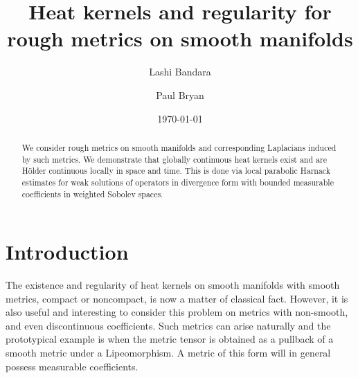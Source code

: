 \documentclass[a4paper, 12pt]{amsart}
\numberwithin{equation}{section}
\renewcommand{\~}{\tilde}
\renewcommand{\-}{\bar}
\newcommand{\8}{\infty}
\begin{document}
\title[Heat kernels and regularity for rough metrics]{Heat kernels and regularity for rough metrics on smooth manifolds}

\author{Lashi Bandara}
\author{Paul Bryan}

\address{Lashi Bandara, 
Institut für Mathematik,
Universität Potsdam, 
D-14476, Potsdam OT Golm, Germany
}

\address{Paul Bryan, 
School of Mathematics and Physics
The University of Queensland
Brisbane QLD 4072, Australia
}


\curraddr{}
\email{}
\date{\today}

\dedicatory{}

\maketitle

\begin{abstract}
We consider rough metrics on smooth manifolds and corresponding Laplacians induced by such metrics.
We demonstrate  that globally continuous heat kernels exist and are Hölder continuous locally in space and time. 
This is done via local parabolic Harnack estimates for weak
solutions of operators in divergence form with bounded measurable coefficients 
in weighted Sobolev spaces.
\end{abstract}

\setcounter{tocdepth}{1}
\tableofcontents

\parindent0cm
\setlength{\parskip}{\baselineskip}



\section{Introduction}
\label{sec:intro}
The existence and regularity of heat kernels on smooth manifolds with smooth metrics, compact or noncompact, 
is now a matter of classical fact. 
However, it is also useful and interesting to consider this problem on
metrics with non-smooth, and even discontinuous coefficients. 
Such metrics can arise naturally and the prototypical example 
is when the metric tensor is obtained as a pullback of a smooth metric under a 
Lipeomorphism. A metric of this form will in general possess measurable
coefficients.
\end{document}
